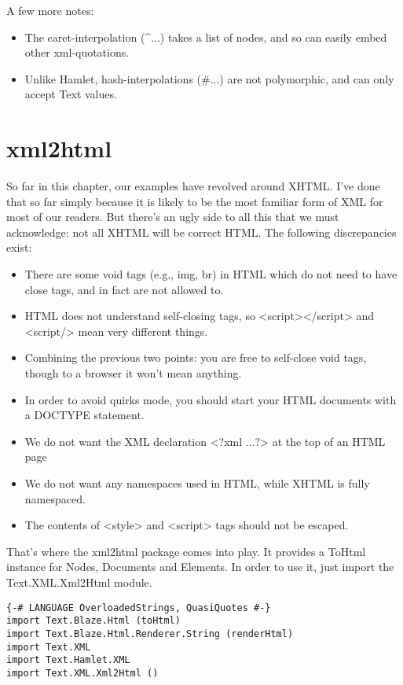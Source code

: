 \begin{itemize}
\begin{end}
A few more notes:

\begin{itemize}
\item The caret-interpolation (^{...}) takes a list of nodes, and so can easily embed other xml-quotations.
\item Unlike Hamlet, hash-interpolations (#{...}) are not polymorphic, and can only accept Text values.
\end{itemize}

\section{xml2html}

So far in this chapter, our examples have revolved around XHTML. I've done that so far simply because it is likely to be the most familiar form of XML for most of our readers. But there's an ugly side to all this that we must acknowledge: not all XHTML will be correct HTML. The following discrepancies exist:

\begin{itemize}
\item There are some void tags (e.g., img, br) in HTML which do not need to have close tags, and in fact are not allowed to.
\item HTML does not understand self-closing tags, so <script></script> and
<script/> mean very different things.
\item Combining the previous two points: you are free to self-close void tags, though to a browser it won't mean anything.
\item In order to avoid quirks mode, you should start your HTML documents with a DOCTYPE statement.
\item We do not want the XML declaration <?xml ...?> at the top of an HTML page
\item We do not want any namespaces used in HTML, while XHTML is fully namespaced.
\item The contents of <style> and <script> tags should not be escaped.
\end{itemize}
  
That's where the xml2html package comes into play. It provides a ToHtml instance for Nodes, Documents and Elements. In order to use it, just import the Text.XML.Xml2Html module.

\begin{lstlisting}
{-# LANGUAGE OverloadedStrings, QuasiQuotes #-}
import Text.Blaze.Html (toHtml)
import Text.Blaze.Html.Renderer.String (renderHtml)
import Text.XML
import Text.Hamlet.XML
import Text.XML.Xml2Html ()


\end{lstlisting}
\end{end}
\end{itemize}
